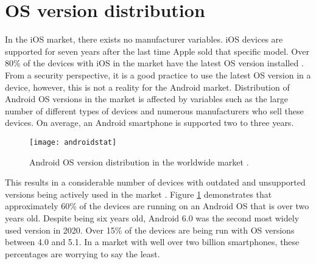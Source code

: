 \documentclass[
  a4paper,  %
  twoside,  %
  bibliography=totoc,
  headsepline,
  cleardoublepage=empty,
  parskip=half,
  draft=false,
  open=any
]{scrbook}
\begin{document}
\section{OS version distribution}
In the iOS market, there exists no manufacturer variables. iOS devices are supported for seven years after the last time Apple sold that specific model. Over 80\% of the devices with iOS in the market have the latest OS version installed \cite{appleStat}. From a security perspective, it is a good practice to use the latest OS version in a device, however, this is not a reality for the Android market. Distribution of Android OS versions in the market is affected by variables such as the large number of different types of devices and numerous manufacturers who sell these devices. On average, an Android smartphone is supported two to three years.
\begin{figure}\centering
	\texttt{[image: androidstat]}
	\caption{Android OS version distribution in the worldwide market \cite{androidStat}.}
	\label{andstat}
\end{figure}
This results in a considerable number of devices with outdated and unsupported versions being actively used in the market \cite{androidStat}. Figure \ref{andstat} demonstrates that approximately 60\% of the devices are running on an Android OS that is over two years old. Despite being six years old, Android 6.0 was the second most widely used version in 2020. Over 15\% of the devices are being run with OS versions between 4.0 and 5.1. In a market with well over two billion smartphones, these percentages are worrying to say the least.  
\end{document}
